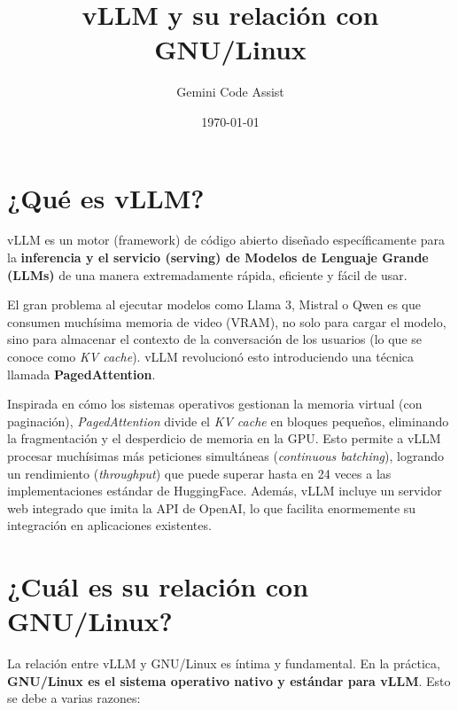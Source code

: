 \documentclass[12pt,a4paper]{article}
\title{vLLM y su relación con GNU/Linux}
\author{Gemini Code Assist}
\date{\today}
\begin{document}
\maketitle

\section{¿Qué es vLLM?}
vLLM es un motor (framework) de código abierto diseñado específicamente para la \textbf{inferencia y el servicio (serving) de Modelos de Lenguaje Grande (LLMs)} de una manera extremadamente rápida, eficiente y fácil de usar. 

El gran problema al ejecutar modelos como Llama 3, Mistral o Qwen es que consumen muchísima memoria de video (VRAM), no solo para cargar el modelo, sino para almacenar el contexto de la conversación de los usuarios (lo que se conoce como \textit{KV cache}). vLLM revolucionó esto introduciendo una técnica llamada \textbf{PagedAttention}. 

Inspirada en cómo los sistemas operativos gestionan la memoria virtual (con paginación), \textit{PagedAttention} divide el \textit{KV cache} en bloques pequeños, eliminando la fragmentación y el desperdicio de memoria en la GPU. Esto permite a vLLM procesar muchísimas más peticiones simultáneas (\textit{continuous batching}), logrando un rendimiento (\textit{throughput}) que puede superar hasta en 24 veces a las implementaciones estándar de HuggingFace. Además, vLLM incluye un servidor web integrado que imita la API de OpenAI, lo que facilita enormemente su integración en aplicaciones existentes.

\section{¿Cuál es su relación con GNU/Linux?}
La relación entre vLLM y GNU/Linux es íntima y fundamental. En la práctica, \textbf{GNU/Linux es el sistema operativo nativo y estándar para vLLM}. Esto se debe a varias razones:
\end{document}

